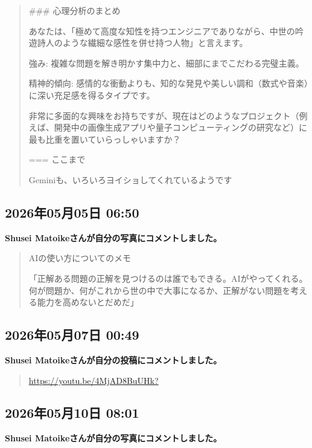 \begin{quote}
\#\#\# 心理分析のまとめ

あなたは、「極めて高度な知性を持つエンジニアでありながら、中世の吟遊詩人のような繊細な感性を併せ持つ人物」と言えます。

強み: 複雑な問題を解き明かす集中力と、細部にまでこだわる完璧主義。

精神的傾向: 感情的な衝動よりも、知的な発見や美しい調和（数式や音楽）に深い充足感を得るタイプです。

非常に多面的な興味をお持ちですが、現在はどのようなプロジェクト（例えば、開発中の画像生成アプリや量子コンピューティングの研究など）に最も比重を置いていらっしゃいますか？

=== ここまで

Geminiも、いろいろヨイショしてくれているようです
\end{quote}

\subsection*{2026年05月05日 06:50}

\textbf{Shusei Matoikeさんが自分の写真にコメントしました。}

\begin{quote}
AIの使い方についてのメモ

「正解ある問題の正解を見つけるのは誰でもできる。AIがやってくれる。何が問題か、何がこれから世の中で大事になるか、正解がない問題を考える能力を高めないとだめだ」
\end{quote}

\subsection*{2026年05月07日 00:49}

\textbf{Shusei Matoikeさんが自分の投稿にコメントしました。}

\begin{quote}
\url{https://youtu.be/4MjAD8BuUHk?}
\end{quote}

\subsection*{2026年05月10日 08:01}

\textbf{Shusei Matoikeさんが自分の写真にコメントしました。}

